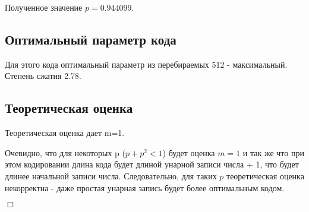 \documentclass[12pt]{article}
\begin{document}
Полученное значение $p=0.944099$.

\subsection*{Оптимальный параметр кода}

Для этого кода оптимальный параметр из перебираемых 512 - максимальный. Степень сжатия 2.78.

\subsection*{Теоретическая оценка}

Теоретическая оценка дает m=1. 

Очевидно, что для некоторых p ($p + p^2 < 1$) будет оценка $m=1$ и так же что при этом кодировании длина кода будет длиной унарной записи числа + 1, что будет длинее начальной записи числа. Следовательно, для таких $p$ теоретическая оценка некорректна - даже простая унарная запись будет более оптимальным кодом.


\begin{flushright}
$\Box$
\end{flushright}
\end{document}
